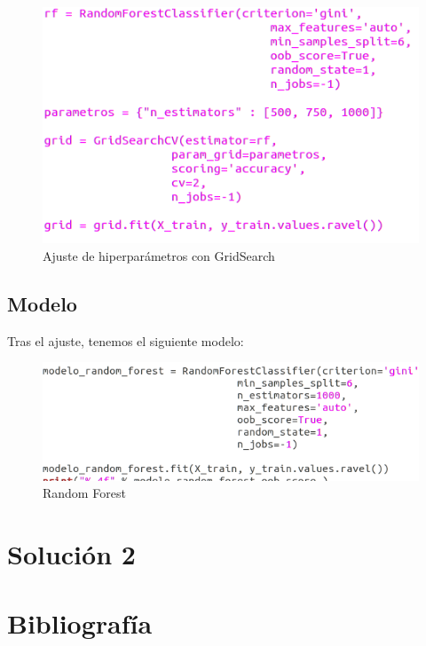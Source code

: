  \begin{figure}[H] %
	\centering
	\includegraphics[scale=0.4]{grid.png}  %
	\caption{Ajuste de hiperparámetros con GridSearch} 
	\label{fig:grid}
\end{figure}

\newpage

\subsection{Modelo}

Tras el ajuste, tenemos el siguiente modelo:

 \begin{figure}[H] %
	\centering
	\includegraphics[scale=0.4]{rf.png}  %
	\caption{Random Forest} 
	\label{fig:RF}
\end{figure}

\newpage
 
\section{Solución 2}

 
\section{Bibliografía}




